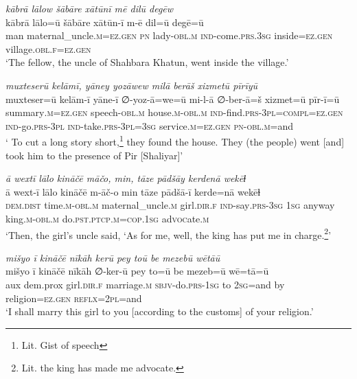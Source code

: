 \ea \label{ŽP.203}
\textit{kābrā lālow šābāre xātūnī mē dilū degēw} \\ 
\gll kābrā lālo=ū šābāre xātūn-ī m-ē dil=ū degē=ū \\ 
 man maternal\_uncle\textsc{.m}\textsc{\textsc{=ez.gen}} \textsc{pn} lady\textsc{-obl}\textsc{.m} \textsc{ind-}come\textsc{.prs}\textsc{.3sg} inside\textsc{\textsc{=ez.gen}} village\textsc{.obl}\textsc{.f}\textsc{\textsc{=ez.gen}} \\ 
\glt `The fellow, the uncle of Shahbara Khatun, went inside the village.'
\z 
 
\ea \label{ŽP.205}
\textit{muxteserū kelāmī, yāney yozāwew milā berāš xizmetū pīrīyū} \\ 
\gll muxteser=ū kelām-ī yāne-ī ∅-yoz-ā=we=ū mi-l-ā ∅-ber-ā=š xizmet=ū pīr-ī=ū \\ 
 summary\textsc{.m}\textsc{\textsc{=ez.gen}} speech\textsc{-obl}\textsc{.m} house\textsc{.m}\textsc{-obl}\textsc{.m} \textsc{ind-}find\textsc{.prs}\textsc{-3pl}\textsc{=compl}\textsc{\textsc{=ez.gen}} \textsc{ind-}go\textsc{.prs}\textsc{-3pl} \textsc{ind-}take\textsc{.prs}\textsc{-3pl}\textsc{=3sg} service\textsc{.m}\textsc{\textsc{=ez.gen}} \textsc{pn}\textsc{-obl}\textsc{.m}=and \\ 
\glt ` To cut a long story short,\footnote{Lit. Gist of speech} they found the house. They (the people) went [and] took him to the presence of Pir [Shaliyar]'
\z 
 
\ea \label{ŽP.206}
\textit{ā wextī lālo kināčē māčo, min, tāze pādšāy kerdenā wekēɫ} \\ 
\gll ā wext-ī lālo kināčē m-āč-o min tāze pādšā-ī kerde=nā wekēɫ \\ 
 \textsc{dem.dist} time\textsc{.m}\textsc{-obl}\textsc{.m} maternal\_uncle\textsc{.m} girl\textsc{.dir}\textsc{.f} \textsc{ind-}say\textsc{.prs}\textsc{-3sg} \textsc{1sg} anyway king\textsc{.m}\textsc{-obl}\textsc{.m} do\textsc{.pst}\textsc{.ptcp}\textsc{.m}\textsc{=cop}\textsc{.\textsc{1sg}} ad\textsc{voc}ate\textsc{.m} \\ 
\glt `Then, the girl’s uncle said, ‘As for me, well, the king has put me in charge.\footnote{Lit. the king has made me advocate.}'
\z 
 
\ea \label{ŽP.207}
\textit{mišyo ī kināčē nīkāh kerū pey toū be mezebū wētāū} \\ 
\gll mišyo ī kināčē nīkāh ∅-ker-ū pey to=ū be mezeb=ū wē=tā=ū \\ 
 aux dem.prox girl\textsc{.dir}\textsc{.f} marriage\textsc{.m} \textsc{sbjv-}do\textsc{.prs}\textsc{-\textsc{1sg}} to \textsc{2sg}=and by religion\textsc{\textsc{=ez.gen}} \textsc{reflx}=\textsc{2pl}=and \\ 
\glt `I shall marry this girl to you [according to the customs] of your religion.'
\z 
 
